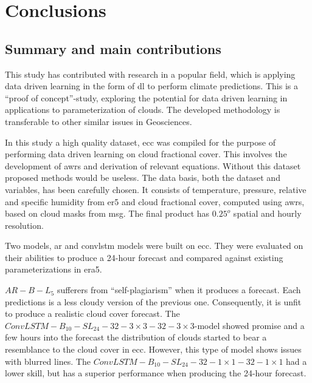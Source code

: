 \chapter{Conclusions}
\section{Summary and main contributions}
This study has contributed with research in a popular field, which is applying data driven learning in the form of \acrshort{dl} to perform climate predictions.
This is a ``proof of concept''-study, exploring the potential for data driven learning in applications to parameterization of clouds. The developed methodology is transferable to other similar issues in Geosciences.

In this study a high quality dataset, \acrfull{ecc} was compiled for the purpose of performing data driven learning on cloud fractional cover. This involves the development of \acrfull{awrs} and derivation of relevant equations. Without this dataset proposed methods would be useless. The data basis, both the dataset and variables, has been carefully chosen. It consists of temperature, pressure, relative and specific humidity from \acrshort{er5} and cloud fractional cover, computed using \acrshort{awrs}, based on cloud masks from \acrshort{msg}. The final product has $0.25^o$ spatial and hourly resolution.

Two models, \acrfull{ar} and \acrfull{convlstm} models were built on \acrshort{ecc}. They were evaluated on their abilities to produce a 24-hour forecast and compared against existing parameterizations in \acrshort{era5}. 

$AR-B-L_5$ sufferers from ``self-plagiarism'' when it produces a forecast. Each predictions is a less cloudy version of the previous one. Consequently, it is unfit to produce a realistic cloud cover forecast.  The $ConvLSTM-B_{10}-SL_{24}-32-3\times3-32-3 \times3$-model showed promise and a few hours into the forecast the distribution of clouds started to bear a resemblance to the cloud cover in \acrshort{ecc}. However, this type of model shows issues with blurred lines. 
The $ConvLSTM-B_{10}-SL_{24}-32-1\times1-32-1 \times1$ had a lower skill, but has
a superior performance when producing the 24-hour forecast.


